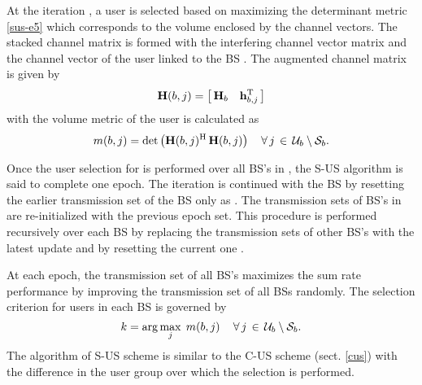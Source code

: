 At the iteration , a user  is selected based on maximizing the determinant metric \eqref{sus-e5} which corresponds to the volume enclosed by the channel vectors. The stacked channel matrix is formed with the interfering channel vector matrix  and the channel vector of the  user linked to the \ac{BS} . The augmented channel matrix  is given by
\begin{equation}
\mbf{H}(b,j) = \matscont{\mbf{H}_b \quad \mvecnxyz{h}{b}{j}^\mrm{T}}
\label{sus-e3}
\end{equation}
with the volume metric of the user  is calculated as
\begin{equation}
m(b,j) = \det{\left ( \mbf{H}(b,j)^\mrm{H} \, \mbf{H}(b,j) \right )} \quad \fall j \inm \mc{U}_b \bs \mc{S}_b.
\label{sus-e4}
\end{equation}

Once the user selection for  is performed over all \ac{BS}'s in , the \ac{S-US} algorithm is said to complete one epoch. The iteration is continued with the \ac{BS}  by resetting the earlier transmission set of the \ac{BS}  only as . The transmission sets of \ac{BS}'s in  are re-initialized with the previous epoch set. This procedure is performed recursively over each \ac{BS}  by replacing the transmission sets of other \ac{BS}'s  with the latest update and by resetting the current one .

At each epoch, the transmission set of all \ac{BS}'s maximizes the sum rate performance by improving the transmission set of all \ac{BS}s randomly. The selection criterion for users in each \ac{BS} is governed by
\begin{equation}
k = \arg \max_j \; m(b,j) \quad \fall j \inm \mc{U}_b \bs \mc{S}_b.
\label{sus-e5}
\end{equation}
The algorithm of \ac{S-US} scheme is similar to the \ac{C-US} scheme (sect. \ref{cus}) with the difference in the user group over which the selection is performed.



